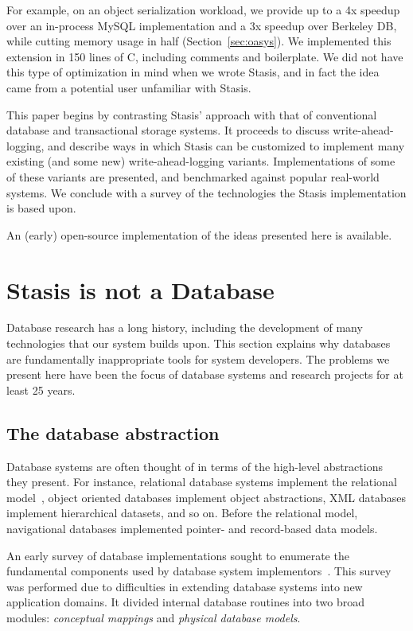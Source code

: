 \documentclass[letterpaper,twocolumn,10pt]{article}
\newcommand{\yad}{Stasis\xspace}
\newcommand{\yads}{Stasis'\xspace}
\begin{document}
For example, on an object serialization workload, we provide up to 
a 4x speedup over an in-process MySQL implementation and a 3x speedup over Berkeley DB, while 
cutting memory usage in half (Section~\ref{sec:oasys}). 
We implemented this extension in 150 lines of C, including comments and boilerplate.  We did not have this type of optimization
in mind when we wrote \yad, and in fact the idea came from a potential 
user unfamiliar with \yad.


This paper begins by contrasting \yads approach with that of
conventional database and transactional storage systems.  It proceeds
to discuss write-ahead-logging, and describe ways in which \yad can be
customized to implement many existing (and some new) write-ahead-logging variants.  Implementations of some of these variants are
presented, and benchmarked against popular real-world systems.  We
conclude with a survey of the technologies the \yad implementation is
based upon.

An (early) open-source implementation of
the ideas presented here is available.

\section{\yad is not a Database}
\label{sec:notDB}
Database research has a long history, including the development of
many technologies that our system builds upon.  This section explains
why databases are fundamentally inappropriate tools for system
developers.  The problems we present here have been the focus of
database systems and research projects for at least 25 years.

\subsection{The database abstraction}

Database systems are often thought of in terms of the high-level
abstractions they present.  For instance, relational database systems
implement the relational model~\cite{codd}, object oriented
databases implement object abstractions, XML databases implement
hierarchical datasets, and so on.  Before the relational model,
navigational databases implemented pointer- and record-based data models.

An early survey of database implementations sought to enumerate the
fundamental components used by database system implementors~\cite{batoryConceptual,batoryPhysical}.  This
survey was performed due to difficulties in extending database systems
into new application domains.  It divided internal database
routines into two broad modules: {\em conceptual mappings} and {\em physical
database models}.
\end{document}
